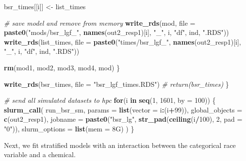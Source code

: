 \documentclass[12pt, twoside]{amherstthesis}
\newenvironment{Shaded}{\begin{snugshade}}{\end{snugshade}}
\newcommand{\AttributeTok}[1]{\textcolor[rgb]{0.13,0.29,0.53}{#1}}
\newcommand{\CommentTok}[1]{\textcolor[rgb]{0.56,0.35,0.01}{\textit{#1}}}
\newcommand{\ControlFlowTok}[1]{\textcolor[rgb]{0.13,0.29,0.53}{\textbf{#1}}}
\newcommand{\DecValTok}[1]{\textcolor[rgb]{0.00,0.00,0.81}{#1}}
\newcommand{\FunctionTok}[1]{\textcolor[rgb]{0.13,0.29,0.53}{\textbf{#1}}}
\newcommand{\NormalTok}[1]{#1}
\newcommand{\OtherTok}[1]{\textcolor[rgb]{0.56,0.35,0.01}{#1}}
\newcommand{\SpecialCharTok}[1]{\textcolor[rgb]{0.81,0.36,0.00}{\textbf{#1}}}
\newcommand{\StringTok}[1]{\textcolor[rgb]{0.31,0.60,0.02}{#1}}
\begin{document}
\begin{Shaded}
\begin{Highlighting}[]
\NormalTok{    bsr\_times[[i]] }\OtherTok{\textless{}{-}}\NormalTok{ list\_times}
    
    \CommentTok{\# save model and remove from memory}
    \FunctionTok{write\_rds}\NormalTok{(mod, }\AttributeTok{file =} 
                \FunctionTok{paste0}\NormalTok{(}\StringTok{"mods/bsr\_lgf\_"}\NormalTok{, }\FunctionTok{names}\NormalTok{(out2\_resp1)[i], }\StringTok{"\_"}\NormalTok{, i, }
                       \StringTok{"df"}\NormalTok{, ind, }\StringTok{".RDS"}\NormalTok{))}
    \FunctionTok{write\_rds}\NormalTok{(list\_times, }\AttributeTok{file =} 
                \FunctionTok{paste0}\NormalTok{(}\StringTok{"times/bsr\_lgf\_"}\NormalTok{, }\FunctionTok{names}\NormalTok{(out2\_resp1)[i], }\StringTok{"\_"}\NormalTok{, i, }
                       \StringTok{"df"}\NormalTok{, ind, }\StringTok{".RDS"}\NormalTok{))}
    
    \FunctionTok{rm}\NormalTok{(mod1, mod2, mod3, mod4, mod)}
\NormalTok{  \}}
  
  \FunctionTok{write\_rds}\NormalTok{(bsr\_times, }\AttributeTok{file =} \StringTok{"bsr\_lgf\_times.RDS"}\NormalTok{)}
  \CommentTok{\# return(bsr\_times)}
\NormalTok{\}}

\CommentTok{\# send all simulated datasets to hpc}
\ControlFlowTok{for}\NormalTok{(i }\ControlFlowTok{in} \FunctionTok{seq}\NormalTok{(}\DecValTok{1}\NormalTok{, }\DecValTok{1601}\NormalTok{, }\AttributeTok{by =} \DecValTok{100}\NormalTok{)) \{}
  \FunctionTok{slurm\_call}\NormalTok{(}
\NormalTok{    run\_bsr\_sm,}
    \AttributeTok{params =} \FunctionTok{list}\NormalTok{(}\AttributeTok{vector =}\NormalTok{ i}\SpecialCharTok{:}\NormalTok{(i}\SpecialCharTok{+}\DecValTok{99}\NormalTok{)),}
    \AttributeTok{global\_objects =} \FunctionTok{c}\NormalTok{(}\StringTok{\textquotesingle{}out2\_resp1\textquotesingle{}}\NormalTok{),}
    \AttributeTok{jobname =} \FunctionTok{paste0}\NormalTok{(}\StringTok{"bsr\_lg"}\NormalTok{, }\FunctionTok{str\_pad}\NormalTok{(}\FunctionTok{ceiling}\NormalTok{(i}\SpecialCharTok{/}\DecValTok{100}\NormalTok{), }\DecValTok{2}\NormalTok{, }\AttributeTok{pad =} \StringTok{"0"}\NormalTok{)),}
    \AttributeTok{slurm\_options =} \FunctionTok{list}\NormalTok{(}\AttributeTok{mem =} \StringTok{\textquotesingle{}8G\textquotesingle{}}\NormalTok{)}
\NormalTok{  )}
\NormalTok{\}}
\end{Highlighting}
\end{Shaded}
\normalsize

Next, we fit stratified models with an interaction between the categorical race variable and a chemical.
\end{document}
